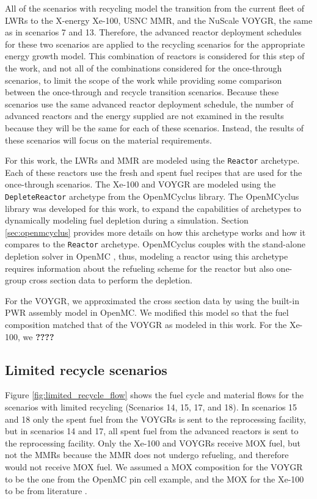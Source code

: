 All of the scenarios with recycling model the transition from the 
current fleet of \glspl{LWR} to the X-energy Xe-100, \gls{USNC} \gls{MMR}, 
and the NuScale VOYGR, the same as in scenarios 7 and 13. Therefore, 
the advanced reactor deployment schedules for these two scenarios are applied 
to the recycling scenarios for the appropriate energy growth model. 
This combination 
of reactors is considered for this step of the work, and not all of the 
combinations considered for the once-through scenarios, to limit the scope 
of the work while providing some comparison between the 
once-through and recycle transition scenarios. Because these scenarios 
use the same advanced reactor deployment schedule, the number of 
advanced reactors and the energy supplied are not examined in the 
results because they will be the same for each of these scenarios. Instead, 
the results of these scenarios will focus on the material requirements. 

For this work, the \glspl{LWR} and \gls{MMR} are modeled using the 
\Cycamore \texttt{Reactor} archetype. Each of these reactors use the 
fresh and spent fuel recipes that are used for the once-through scenarios. 
The Xe-100 and VOYGR are modeled using the \texttt{DepleteReactor} 
archetype from the OpenMCyclus library. The OpenMCyclus library was 
developed for this work, to expand the capabilities of \Cyclus archetypes 
to dynamically modeling fuel depletion during a simulation. Section 
\ref{sec:openmcyclus} provides more details on how this archetype 
works and how it compares to the \Cycamore \texttt{Reactor} 
archetype. OpenMCyclus couples with the stand-alone depletion 
solver in OpenMC \cite{romano_depletion_2021}, thus, modeling a 
reactor using this archetype requires information about the refueling 
scheme for the reactor but also one-group cross section data to perform the 
depletion. 

For the VOYGR, we approximated the cross section data by using the 
built-in \gls{PWR} assembly model in OpenMC. We modified this model so 
that the fuel composition matched that of the VOYGR as modeled in this 
work. For the Xe-100, we \textbf{????}

\subsection{Limited recycle scenarios}
Figure \ref{fig:limited_recycle_flow} shows the fuel cycle and material flows 
for the scenarios with limited recycling (Scenarios 14, 15, 17, and 18). 
In scenarios 15 and 18 only the spent fuel from the 
VOYGRs is sent to the reprocessing facility, but in scenarios 14 and 17, 
all spent fuel from the advanced reactors is sent to the 
reprocessing facility. Only the Xe-100 and VOYGRs receive \gls{MOX} fuel, 
but not the \glspl{MMR} because the \gls{MMR} does not undergo refueling, 
and therefore would not receive \gls{MOX} fuel. We assumed a \gls{MOX} 
composition for the VOYGR to be the one from the OpenMC pin cell example, 
and the \gls{MOX} for the Xe-100 to be from literature \cite{kuijper_htgr_2006}.

